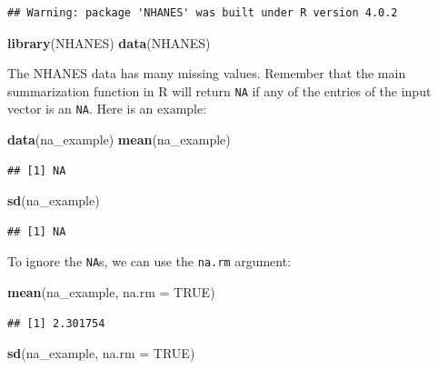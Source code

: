 \documentclass[
]{article}
\newenvironment{Shaded}{\begin{snugshade}}{\end{snugshade}}
\newcommand{\DataTypeTok}[1]{\textcolor[rgb]{0.13,0.29,0.53}{#1}}
\newcommand{\KeywordTok}[1]{\textcolor[rgb]{0.13,0.29,0.53}{\textbf{#1}}}
\newcommand{\NormalTok}[1]{#1}
\newcommand{\OtherTok}[1]{\textcolor[rgb]{0.56,0.35,0.01}{#1}}
\begin{document}
\begin{verbatim}
## Warning: package 'NHANES' was built under R version 4.0.2
\end{verbatim}

\begin{Shaded}
\begin{Highlighting}[]
\KeywordTok{library}\NormalTok{(NHANES)}
\KeywordTok{data}\NormalTok{(NHANES)}
\end{Highlighting}
\end{Shaded}

The NHANES data has many missing values. Remember that the main
summarization function in R will return \texttt{NA} if any of the
entries of the input vector is an \texttt{NA}. Here is an example:

\begin{Shaded}
\begin{Highlighting}[]
\KeywordTok{data}\NormalTok{(na_example)}
\KeywordTok{mean}\NormalTok{(na_example)}
\end{Highlighting}
\end{Shaded}

\begin{verbatim}
## [1] NA
\end{verbatim}

\begin{Shaded}
\begin{Highlighting}[]
\KeywordTok{sd}\NormalTok{(na_example)}
\end{Highlighting}
\end{Shaded}

\begin{verbatim}
## [1] NA
\end{verbatim}

To ignore the \texttt{NA}s, we can use the \texttt{na.rm} argument:

\begin{Shaded}
\begin{Highlighting}[]
\KeywordTok{mean}\NormalTok{(na_example, }\DataTypeTok{na.rm =} \OtherTok{TRUE}\NormalTok{)}
\end{Highlighting}
\end{Shaded}

\begin{verbatim}
## [1] 2.301754
\end{verbatim}

\begin{Shaded}
\begin{Highlighting}[]
\KeywordTok{sd}\NormalTok{(na_example, }\DataTypeTok{na.rm =} \OtherTok{TRUE}\NormalTok{)}
\end{Highlighting}
\end{Shaded}
\end{document}
